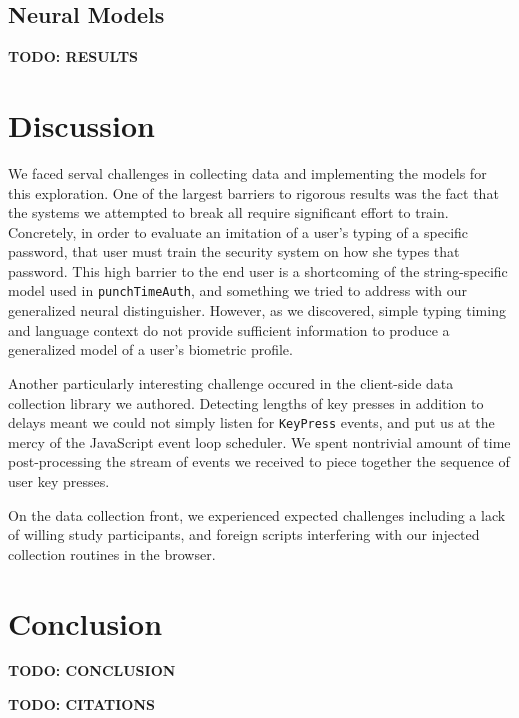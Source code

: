 \documentclass{amsart}
\begin{document}
\begin{multicols*}{2}
\subsection{Neural Models}

\textbf{TODO: RESULTS}

\section{Discussion}

We faced serval challenges in collecting data and implementing the models for this exploration. One of the largest barriers to rigorous results was the fact that the systems we attempted to break all require significant effort to train. Concretely, in order to evaluate an imitation of a user's typing of a specific password, that user must train the security system on how she types that password. This high barrier to the end user is a shortcoming of the string-specific model used in \texttt{punchTimeAuth}, and something we tried to address with our generalized neural distinguisher. However, as we discovered, simple typing timing and language context do not provide sufficient information to produce a generalized model of a user's biometric profile.

Another particularly interesting challenge occured in the client-side data collection library we authored. Detecting lengths of key presses in addition to delays meant we could not simply listen for \texttt{KeyPress} events, and put us at the mercy of the JavaScript event loop scheduler. We spent nontrivial amount of time post-processing the stream of events we received to piece together the sequence of user key presses.

On the data collection front, we experienced expected challenges including a lack of willing study participants, and foreign scripts interfering with our injected collection routines in the browser.

\section{Conclusion}

\textbf{TODO: CONCLUSION}

\textbf{TODO: CITATIONS}

\end{multicols*}
\end{document}
